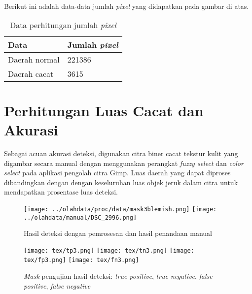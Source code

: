 \documentclass[laporan.tex]{subfiles}
\begin{document}


Berikut ini adalah data-data jumlah \emph{pixel} yang didapatkan pada gambar di atas.

\begin{table}[h!]
\centering
\begin{tabular}{|l|l|}
\hline
Data & Jumlah \emph{pixel} \\
\hline
Daerah normal & 221386 \\
Daerah cacat & 3615 \\
\hline
\end{tabular}
\caption{Data perhitungan jumlah \emph{pixel}}
\end{table}

\section{Perhitungan Luas Cacat dan Akurasi}

Sebagai acuan akurasi deteksi, digunakan citra biner cacat tekstur kulit yang digambar secara manual dengan menggunakan perangkat \emph{fuzzy select} dan \emph{color select} pada aplikasi pengolah citra Gimp. Luas daerah yang dapat diproses dibandingkan dengan dengan keseluruhan luas objek jeruk dalam citra untuk mendapatkan prosentase luas deteksi.

\begin{figure}[h!]
\centering
\texttt{[image: ../olahdata/proc/data/mask3blemish.png]}
\texttt{[image: ../olahdata/manual/DSC\_2996.png]} \qquad
\caption{Hasil deteksi dengan pemrosesan dan hasil penandaan manual}
\end{figure}

\begin{figure}[h!]
\centering
\texttt{[image: tex/tp3.png]} \hskip 0.5cm
\texttt{[image: tex/tn3.png]} \hskip 0.5cm
\texttt{[image: tex/fp3.png]} \hskip 0.5cm
\texttt{[image: tex/fn3.png]}
\caption{\emph{Mask} pengujian hasil deteksi: \emph{true positive}, \emph{true negative}, \emph{false positive}, \emph{false negative}}
\end{figure}
\end{document}

